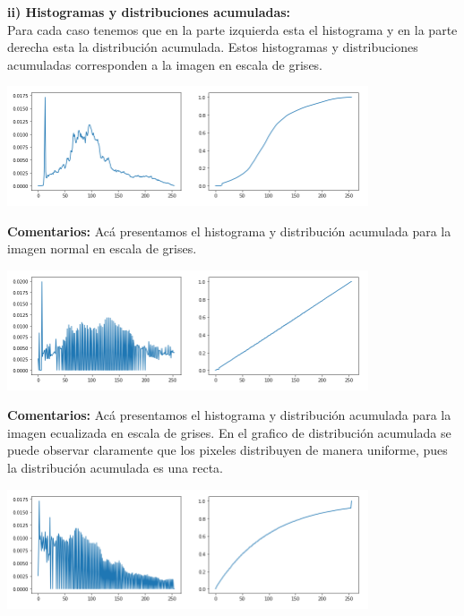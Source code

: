 \documentclass[11pt]{article}
\begin{document}
\textbf{ii) Histogramas y distribuciones acumuladas:} \\

Para cada caso tenemos que en la parte izquierda esta el histograma y en la parte derecha esta la distribución acumulada. Estos histogramas y distribuciones acumuladas corresponden a la imagen en escala de grises. \\

\begin{center}
\includegraphics[width=0.8\textwidth]{./figures/grafico_neymar_normal}
\end{center}

\textbf{Comentarios:} Acá presentamos el histograma y distribución acumulada para la imagen normal en escala de grises. \\


\begin{center}
\includegraphics[width=0.8\textwidth]{./figures/grafico_neymar_ecualizado}
\end{center}

\textbf{Comentarios:} Acá presentamos el histograma y distribución acumulada para la imagen ecualizada en escala de grises. En el grafico de distribución acumulada se puede observar claramente que los pixeles distribuyen de manera uniforme, pues la distribución acumulada es una recta. \\

\begin{center}
\includegraphics[width=0.8\textwidth]{./figures/grafico_neymar_exponencial}
\end{center}
\end{document}
